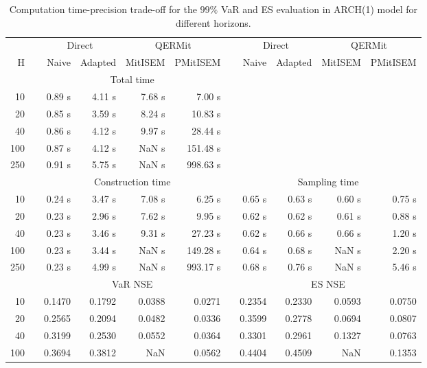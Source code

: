 { \renewcommand{\arraystretch}{1.3} 
\begin{table}[h] 
\centering 
\caption{Computation time-precision trade-off for the  $99\%$ VaR and ES evaluation in ARCH(1) model for different horizons.} 
\label{tab:time_precision_arch} 
\begin{tabular}{rr rrrr r rrrr}  
 & & \multicolumn{2}{c}{Direct} & \multicolumn{2}{c}{QERMit}&  & \multicolumn{2}{c}{Direct} & \multicolumn{2}{c}{QERMit} \\ \cline{3-6} \cline{8-11} 
 H & & Naive & Adapted & MitISEM & PMitISEM & & Naive & Adapted & MitISEM & PMitISEM \\ \hline 
 & & \multicolumn{4}{c}{Total time}  \\ \cline{3-6} 
10 & & 0.89 s & 4.11 s & 7.68 s & 7.00 s \\ 
20 & & 0.85 s & 3.59 s & 8.24 s & 10.83 s \\ 
40 & & 0.86 s & 4.12 s & 9.97 s & 28.44 s \\ 
100 & & 0.87 s & 4.12 s &  NaN s & 151.48 s \\ 
250 & & 0.91 s & 5.75 s &  NaN s & 998.63 s \\ 
\hline 
 & & \multicolumn{4}{c}{Construction time} & & \multicolumn{4}{c}{ Sampling time} \\ \cline{3-6}  \cline{8-11}
10 & & 0.24 s & 3.47 s & 7.08 s & 6.25 s && 0.65 s & 0.63 s & 0.60 s & 0.75 s \\ 
20 & & 0.23 s & 2.96 s & 7.62 s & 9.95 s && 0.62 s & 0.62 s & 0.61 s & 0.88 s \\ 
40 & & 0.23 s & 3.46 s & 9.31 s & 27.23 s && 0.62 s & 0.66 s & 0.66 s & 1.20 s \\ 
100 & & 0.23 s & 3.44 s &  NaN s & 149.28 s && 0.64 s & 0.68 s &  NaN s & 2.20 s \\ 
250 & & 0.23 s & 4.99 s &  NaN s & 993.17 s && 0.68 s & 0.76 s &  NaN s & 5.46 s \\ 
\hline 
 & & \multicolumn{4}{c}{VaR NSE} &&  \multicolumn{4}{c}{ES NSE} \\ \cline{3-6}  \cline{8-11}
10 && 0.1470  & 0.1792  & 0.0388 & 0.0271 && 0.2354  & 0.2330  & 0.0593 & 0.0750 \\ 
20 && 0.2565  & 0.2094  & 0.0482 & 0.0336 && 0.3599  & 0.2778  & 0.0694 & 0.0807 \\ 
40 && 0.3199  & 0.2530  & 0.0552 & 0.0364 && 0.3301  & 0.2961  & 0.1327 & 0.0763 \\ 
100 && 0.3694  & 0.3812  &    NaN & 0.0562 && 0.4404  & 0.4509  &    NaN & 0.1353 \\ 

\end{tabular}
\end{table}}
